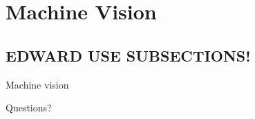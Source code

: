 \documentclass{beamer}
\begin{document}
\section{Machine Vision}
\subsection{EDWARD USE SUBSECTIONS!}
\begin{frame}
    \begin{center}
        \Huge Machine vision
    \end{center}
\end{frame}







\begin{frame}
    \begin{center}
        \Huge Questions?
    \end{center}
\end{frame}
\end{document}
